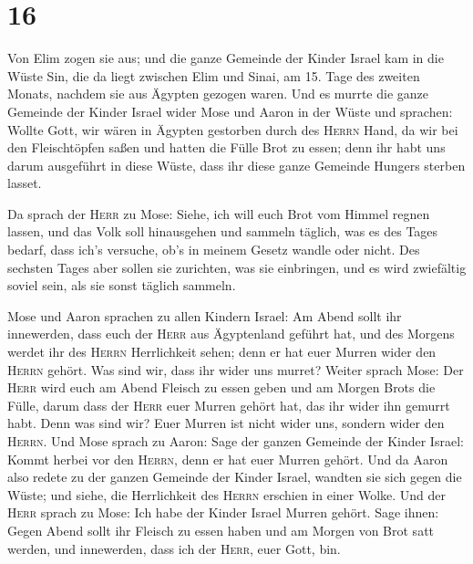 \hypertarget{section-15}{%
\section{16}\label{section-15}}

 Von Elim zogen sie aus; und die ganze Gemeinde der Kinder
Israel kam in die Wüste Sin, die da liegt zwischen Elim und Sinai, am
15. Tage des zweiten Monats, nachdem sie aus Ägypten gezogen waren.
 Und es murrte die ganze Gemeinde der Kinder Israel wider
Mose und Aaron in der Wüste  und sprachen: Wollte Gott,
wir wären in Ägypten gestorben durch des \textsc{Herrn} Hand, da wir bei
den Fleischtöpfen saßen und hatten die Fülle Brot zu essen; denn ihr
habt uns darum ausgeführt in diese Wüste, dass ihr diese ganze Gemeinde
Hungers sterben lasset.

 Da sprach der \textsc{Herr} zu Mose: Siehe, ich will euch
Brot vom Himmel regnen lassen, und das Volk soll hinausgehen und sammeln
täglich, was es des Tages bedarf, dass ich's versuche, ob's in meinem
Gesetz wandle oder nicht.  Des sechsten Tages aber sollen
sie zurichten, was sie einbringen, und es wird zwiefältig soviel sein,
als sie sonst täglich sammeln.

 Mose und Aaron sprachen zu allen Kindern Israel: Am Abend
sollt ihr innewerden, dass euch der \textsc{Herr} aus Ägyptenland
geführt hat,  und des Morgens werdet ihr des
\textsc{Herrn} Herrlichkeit sehen; denn er hat euer Murren wider den
\textsc{Herrn} gehört. Was sind wir, dass ihr wider uns murret?
 Weiter sprach Mose: Der \textsc{Herr} wird euch am Abend
Fleisch zu essen geben und am Morgen Brots die Fülle, darum dass der
\textsc{Herr} euer Murren gehört hat, das ihr wider ihn gemurrt habt.
Denn was sind wir? Euer Murren ist nicht wider uns, sondern wider den
\textsc{Herrn}.  Und Mose sprach zu Aaron: Sage der ganzen
Gemeinde der Kinder Israel: Kommt herbei vor den \textsc{Herrn}, denn er
hat euer Murren gehört.  Und da Aaron also redete zu der
ganzen Gemeinde der Kinder Israel, wandten sie sich gegen die Wüste; und
siehe, die Herrlichkeit des \textsc{Herrn} erschien in einer Wolke.
 Und der \textsc{Herr} sprach zu Mose: 
Ich habe der Kinder Israel Murren gehört. Sage ihnen: Gegen Abend sollt
ihr Fleisch zu essen haben und am Morgen von Brot satt werden, und
innewerden, dass ich der \textsc{Herr}, euer Gott, bin.

